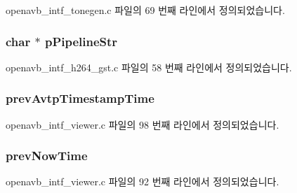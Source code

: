 openavb\+\_\+intf\+\_\+tonegen.\+c 파일의 69 번째 라인에서 정의되었습니다.

\subsubsection[{\texorpdfstring{p\+Pipeline\+Str}{pPipelineStr}}]{\setlength{\rightskip}{0pt plus 5cm}char $\ast$ p\+Pipeline\+Str}\hypertarget{structpvt__data__t_a1f92697b6354d417c841cb4cfdde7bf9}{}\label{structpvt__data__t_a1f92697b6354d417c841cb4cfdde7bf9}


openavb\+\_\+intf\+\_\+h264\+\_\+gst.\+c 파일의 58 번째 라인에서 정의되었습니다.

\subsubsection[{\texorpdfstring{prev\+Avtp\+Timestamp\+Time}{prevAvtpTimestampTime}}]{ prev\+Avtp\+Timestamp\+Time}\hypertarget{structpvt__data__t_a2d18746b234cebb8ee2884c847e51df8}{}\label{structpvt__data__t_a2d18746b234cebb8ee2884c847e51df8}


openavb\+\_\+intf\+\_\+viewer.\+c 파일의 98 번째 라인에서 정의되었습니다.

\subsubsection[{\texorpdfstring{prev\+Now\+Time}{prevNowTime}}]{ prev\+Now\+Time}\hypertarget{structpvt__data__t_a2a47ecdf17836136d9ef51939f8cfcb9}{}\label{structpvt__data__t_a2a47ecdf17836136d9ef51939f8cfcb9}


openavb\+\_\+intf\+\_\+viewer.\+c 파일의 92 번째 라인에서 정의되었습니다.

